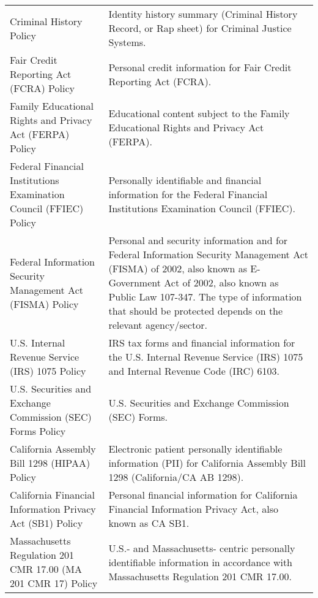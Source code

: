 \documentclass[letterpaper,10pt,english]{sphinxmanual}
\begin{document}


\begin{savenotes}\sphinxattablestart
\centering
\begin{tabulary}{\linewidth}[t]{|T|T|}
\hline
{}\relax &\relax \\
\hline
Criminal History Policy
&
Identity history summary (Criminal History Record,
or Rap sheet) for Criminal Justice Systems.
\\
\hline
Fair Credit Reporting Act (FCRA) Policy
&
Personal credit information for Fair Credit
Reporting Act (FCRA).
\\
\hline
Family Educational Rights and Privacy
Act (FERPA) Policy
&
Educational content subject to the Family
Educational Rights and Privacy Act (FERPA).
\\
\hline
Federal Financial Institutions
Examination Council (FFIEC) Policy
&
Personally identifiable and financial information for
the Federal Financial Institutions Examination
Council (FFIEC).
\\
\hline
Federal Information Security
Management Act (FISMA) Policy
&
Personal and security information and for Federal Information
Security Management Act (FISMA) of 2002, also known as
E-Government Act of 2002, also known as Public  Law 107-347.
The type of information that should be protected depends
on the relevant agency/sector.
\\
\hline
U.S. Internal Revenue Service (IRS)
1075 Policy
&
IRS tax forms and financial information for the U.S.
Internal Revenue Service (IRS) 1075 and Internal
Revenue Code (IRC) 6103.
\\
\hline
U.S. Securities and Exchange
Commission (SEC) Forms Policy
&
U.S. Securities and Exchange Commission (SEC)
Forms.
\\
\hline
California Assembly Bill 1298 (HIPAA)
Policy
&
Electronic patient personally identifiable information
(PII) for California Assembly Bill 1298
(California/CA AB 1298).
\\
\hline
California Financial Information Privacy
Act (SB1) Policy
&
Personal financial information for California
Financial Information Privacy Act, also known as
CA SB1.
\\
\hline
Massachusetts Regulation 201 CMR
17.00 (MA 201 CMR 17) Policy
&
U.S.- and Massachusetts- centric personally identifiable
information in accordance with Massachusetts Regulation 201
CMR 17.00.
\\
\hline
\end{tabulary}
\par
\sphinxattableend\end{savenotes}
\end{document}
